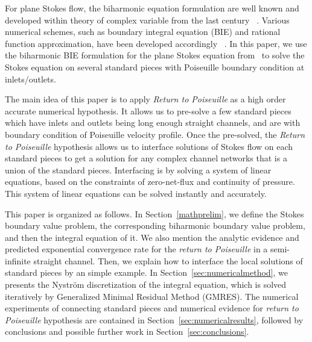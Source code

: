 \documentclass[10pt,twocolumn,letterpaper]{article}
\begin{document}
For plane Stokes flow, the biharmonic equation formulation are well known and
developed within theory of complex variable from the last century
~\cite{ladyzhenskayaMathematicalTheoryViscous1964}. Various numerical schemes,
such as boundary integral equation (BIE) and rational function approximation,
have been developed accordingly
~\cite{greengardIntegralEquationMethods1996,trefethenApproximationTheoryApproximation2019}.
In this paper, we use the biharmonic BIE formulation for the plane Stokes
equation from~\cite{greengardIntegralEquationMethods1996} to solve the Stokes
equation on several standard pieces with Poiseuille boundary condition at
inlets/outlets.

The main idea of this paper is to apply \textit{Return to Poiseuille} as a high
order accurate numerical hypothesis. It allows us to pre-solve a few standard
pieces which have inlets and outlets being long enough straight channels, and
are with boundary condition of Poiseuille velocity profile. Once the
pre-solved, the \textit{Return to Poiseuille} hypothesis allows us to interface
solutions of Stokes flow on each standard pieces to get a solution for any
complex channel networks that is a union of the standard pieces. Interfacing is
by solving a system of linear equations, based on the constraints of
zero-net-flux and continuity of pressure. This system of linear equations can
be solved instantly and accurately.

This paper is organized as follows. In Section~\ref{mathprelim}, we define the
Stokes boundary value problem, the corresponding biharmonic boundary value
problem, and then the integral equation of it. We also mention the analytic
evidence and predicted exponential convergence rate for the \textit{return to
  Poiseuille} in a semi-infinite straight channel. Then, we explain how to
interface the local solutions of standard pieces by an simple example. In
Section~\ref{sec:numericalmethod}, we presents the Nystr\"om discretization of
the integral equation, which is solved iteratively by Generalized Minimal
Residual Method (GMRES).
The numerical experiments of connecting standard pieces and numerical evidence
for \textit{return to Poiseuille} hypothesis are contained in Section~\ref{sec:numericalresults}, 
followed by conclusions and possible further work
in Section~\ref{sec:conclusions}.
\end{document}
